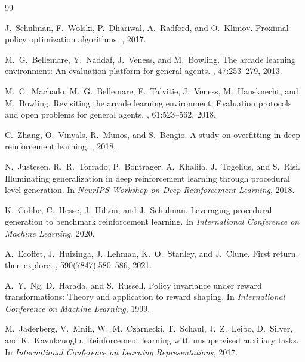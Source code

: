 \documentclass[11pt]{article}
\begin{document}

\begin{thebibliography}{99}

J.~Schulman, F.~Wolski, P.~Dhariwal, A.~Radford, and O.~Klimov.
\newblock Proximal policy optimization algorithms.
, 2017.

M.~G.~Bellemare, Y.~Naddaf, J.~Veness, and M.~Bowling.
\newblock The arcade learning environment: An evaluation platform for general
  agents.
, 47:253--279, 2013.

M.~C.~Machado, M.~G.~Bellemare, E.~Talvitie, J.~Veness, M.~Hausknecht, and
  M.~Bowling.
\newblock Revisiting the arcade learning environment: Evaluation protocols and
  open problems for general agents.
, 61:523--562, 2018.

C.~Zhang, O.~Vinyals, R.~Munos, and S.~Bengio.
\newblock A study on overfitting in deep reinforcement learning.
, 2018.

N.~Justesen, R.~R.~Torrado, P.~Bontrager, A.~Khalifa, J.~Togelius, and
  S.~Risi.
\newblock Illuminating generalization in deep reinforcement learning through
  procedural level generation.
\newblock In {\em NeurIPS Workshop on Deep Reinforcement Learning}, 2018.

K.~Cobbe, C.~Hesse, J.~Hilton, and J.~Schulman.
\newblock Leveraging procedural generation to benchmark reinforcement learning.
\newblock In {\em International Conference on Machine Learning}, 2020.

A.~Ecoffet, J.~Huizinga, J.~Lehman, K.~O.~Stanley, and J.~Clune.
\newblock First return, then explore.
, 590(7847):580--586, 2021.

A.~Y.~Ng, D.~Harada, and S.~Russell.
\newblock Policy invariance under reward transformations: Theory and application
  to reward shaping.
\newblock In {\em International Conference on Machine Learning}, 1999.

M.~Jaderberg, V.~Mnih, W.~M.~Czarnecki, T.~Schaul, J.~Z.~Leibo, D.~Silver,
  and K.~Kavukcuoglu.
\newblock Reinforcement learning with unsupervised auxiliary tasks.
\newblock In {\em International Conference on Learning Representations}, 2017.


\end{thebibliography}
\end{document}
